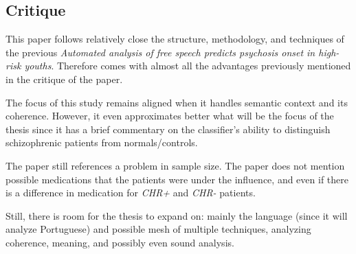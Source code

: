 \documentclass{Paper_Summary}
\begin{document}
\makepapertitle

\breakline

\begin{center}
    \section*{Critique}
\end{center}

    This paper follows relatively close the structure, methodology, and techniques of the previous \emph{Automated analysis of free speech predicts psychosis onset in high-risk youths}. Therefore comes with almost all the advantages previously mentioned in the critique of the paper.

    The focus of this study remains aligned when it handles semantic context and its coherence. However, it even approximates better what will be the focus of the thesis since it has a brief commentary on the classifier's ability to distinguish schizophrenic patients from normals/controls.

    The paper still references a problem in sample size. The paper does not mention possible medications that the patients were under the influence, and even if there is a difference in medication for \emph{CHR+} and \emph{CHR-} patients.

    Still, there is room for the thesis to expand on: mainly the language (since it will analyze Portuguese) and possible mesh of multiple techniques, analyzing coherence, meaning, and possibly even sound analysis.

\breakline
\end{document}

